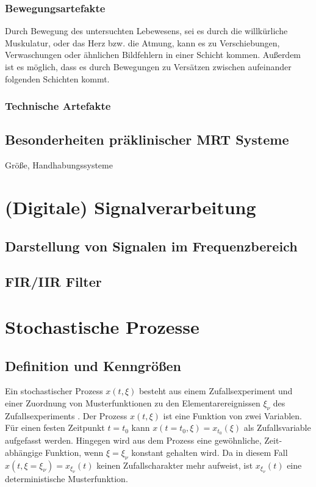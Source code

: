 \subsubsection{Bewegungsartefakte}
Durch Bewegung des untersuchten Lebewesens, sei es durch die willkürliche Muskulatur, oder das Herz bzw. die Atmung, kann es zu Verschiebungen, Verwaschungen oder ähnlichen Bildfehlern in einer Schicht kommen. Außerdem ist es möglich, dass es durch Bewegungen zu Versätzen zwischen aufeinander folgenden Schichten kommt.                       

\subsubsection{Technische Artefakte}

\subsection{Besonderheiten präklinischer MRT Systeme}
Größe, Handhabungssysteme

\section{(Digitale) Signalverarbeitung}

\subsection{Darstellung von Signalen im Frequenzbereich}
\subsection{FIR/IIR Filter}

\section{Stochastische Prozesse}

\subsection{Definition und Kenngrößen}
Ein stochastischer Prozess $x(t,\xi)$ besteht aus einem Zufallsexperiment und einer Zuordnung von Musterfunktionen zu den Elementarereignissen $\xi_\nu$ des Zufallsexperiments \cite[S.~243]{Leon2015}. Der Prozess $x(t,\xi)$ ist eine Funktion von zwei Variablen. Für einen festen Zeitpunkt $t=t_0$ kann $x(t=t_0,\xi)=x_{t_0}(\xi)$ als Zufallsvariable aufgefasst werden. Hingegen wird aus dem Prozess eine gewöhnliche, Zeit-abhängige Funktion, wenn $\xi=\xi_\nu$ konstant gehalten wird. Da in diesem Fall $x(t,\xi=\xi_\nu)=x_{\xi_\nu}(t)$ keinen Zufallscharakter mehr aufweist, ist $x_{\xi_\nu}(t)$ eine deterministische Musterfunktion.



